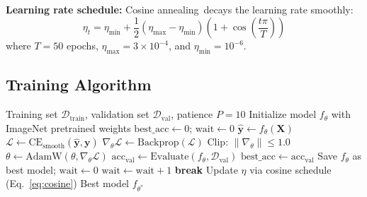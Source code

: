 \documentclass[10pt,a4paper,twocolumn]{article}
\begin{document}
\textbf{Learning rate schedule:} Cosine annealing~decays the learning rate smoothly:
\begin{equation}
\eta_t = \eta_{\min} + \frac{1}{2}(\eta_{\max} - \eta_{\min})\left(1 + \cos\left(\frac{t\pi}{T}\right)\right)
\label{eq:cosine}
\end{equation}
where $T=50$ epochs, $\eta_{\max}=3\times10^{-4}$, and $\eta_{\min}=10^{-6}$.

\subsection{Training Algorithm}

\begin{algorithm}[H]
\caption{EfficientNetV2 Training with Early Stopping}
\label{alg:training}
\begin{algorithmic}[1]
\REQUIRE Training set $\mathcal{D}_{\text{train}}$, validation set $\mathcal{D}_{\text{val}}$, patience $P=10$
\STATE Initialize model $f_\theta$ with ImageNet pretrained weights
\STATE $\text{best\_acc} \leftarrow 0$; $\text{wait} \leftarrow 0$
        \STATE $\hat{\mathbf{y}} \leftarrow f_\theta(\mathbf{X})$ 
        \STATE $\mathcal{L} \leftarrow \text{CE}_{\text{smooth}}(\hat{\mathbf{y}}, \mathbf{y})$
        \STATE $\nabla_\theta \mathcal{L} \leftarrow \text{Backprop}(\mathcal{L})$
        \STATE Clip: $\|\nabla_\theta\| \leq 1.0$
        \STATE $\theta \leftarrow \text{AdamW}(\theta, \nabla_\theta \mathcal{L})$
    \ENDFOR
    \STATE $\text{acc}_{\text{val}} \leftarrow \text{Evaluate}(f_\theta, \mathcal{D}_{\text{val}})$
        \STATE $\text{best\_acc} \leftarrow \text{acc}_{\text{val}}$
        \STATE Save $f_\theta$ as best model; $\text{wait} \leftarrow 0$
    \ELSE
        \STATE $\text{wait} \leftarrow \text{wait} + 1$
            \STATE \textbf{break} 
        \ENDIF
    \ENDIF
    \STATE Update $\eta$ via cosine schedule (Eq.~\ref{eq:cosine})
\ENDFOR
\RETURN Best model $f_{\theta^*}$
\end{algorithmic}
\end{algorithm}
\end{document}
